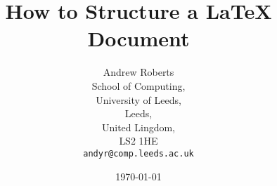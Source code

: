 \documentclass{article}
\begin{document}
\title{How to Structure a \LaTeX{} Document} %
\author{Andrew Roberts\\
	 School of Computing,\\
	 	University of Leeds,\\
	 	Leeds,\\
	 	United Lingdom,\\
	 	LS2 1HE\\
	 	\texttt{andyr@comp.leeds.ac.uk}} %
\date{\today}
\maketitle
\end{document}
